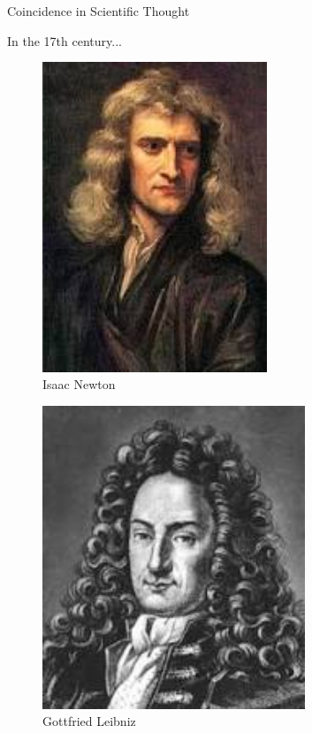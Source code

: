 \documentclass{beamer}
\begin{document}
\begin{frame}{Coincidence in Scientific Thought}
	\begin{block}{In the 17th century...}
			\begin{figure}
				\begin{minipage}[t]{0.48\textwidth}
					\centering
					\includegraphics[width=0.6\textwidth]{newton.jpg}\\
					Isaac Newton
				\end{minipage}
				\begin{minipage}[t]{0.48\textwidth}
					\centering
					\includegraphics[width=0.7\textwidth]{leibniz.jpg}\\
					Gottfried Leibniz
				\end{minipage}
			\end{figure}
	\end{block}
\end{frame}
\end{document}
